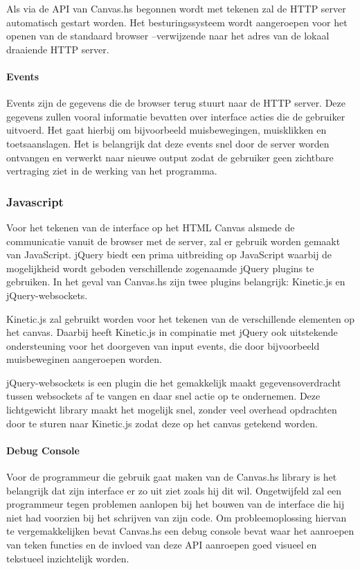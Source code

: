 Als via de API van Canvas.hs begonnen wordt met tekenen zal de HTTP server automatisch gestart worden. Het besturingssysteem wordt aangeroepen voor het openen van de standaard browser --verwijzende naar het adres van de lokaal draaiende HTTP server.




\paragraph{Events}
Events zijn de gegevens die de browser terug stuurt naar de HTTP server. Deze gegevens zullen vooral informatie bevatten over interface acties die de gebruiker uitvoerd. Het gaat hierbij om bijvoorbeeld muisbewegingen, muisklikken en toetsaanslagen. Het is belangrijk dat deze events snel door de server worden ontvangen en verwerkt naar nieuwe output zodat de gebruiker geen zichtbare vertraging ziet in de werking van het programma.

\subsubsection{Javascript}
Voor het tekenen van de interface op het HTML Canvas alsmede de communicatie vanuit de browser met de server, zal er gebruik worden gemaakt van JavaScript. jQuery biedt een prima uitbreiding op JavaScript waarbij de mogelijkheid wordt geboden verschillende zogenaamde jQuery plugins te gebruiken. In het geval van Canvas.hs zijn twee plugins belangrijk: Kinetic.js en jQuery-websockets.

Kinetic.js zal gebruikt worden voor het tekenen van de verschillende elementen op het canvas. Daarbij heeft Kinetic.js in compinatie met jQuery ook uitstekende ondersteuning voor het doorgeven van input events, die door bijvoorbeeld muisbeweginen aangeroepen worden. 

jQuery-websockets is een plugin die het gemakkelijk maakt gegevensoverdracht tussen websockets af te vangen en daar snel actie op te ondernemen. Deze lichtgewicht library maakt het mogelijk snel, zonder veel overhead opdrachten door te sturen naar Kinetic.js zodat deze op het canvas getekend worden.

\paragraph{Debug Console}
Voor de programmeur die gebruik gaat maken van de Canvas.hs library is het belangrijk dat zijn interface er zo uit ziet zoals hij dit wil. Ongetwijfeld zal een programmeur tegen problemen aanlopen bij het bouwen van de interface die hij niet had voorzien bij het schrijven van zijn code. Om probleemoplossing hiervan te vergemakkelijken bevat Canvas.hs een debug console bevat waar het aanroepen van teken functies en de invloed van deze API aanroepen goed visueel en tekstueel inzichtelijk worden.
